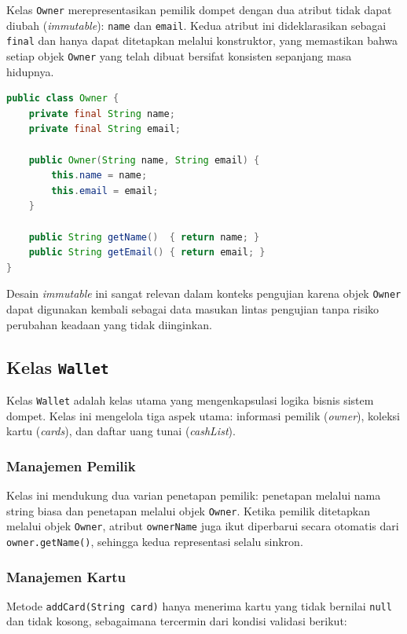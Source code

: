 \documentclass[12pt,a4paper]{article}
\begin{document}
Kelas \texttt{Owner} merepresentasikan pemilik dompet dengan dua atribut tidak dapat
diubah (\textit{immutable}): \texttt{name} dan \texttt{email}.  Kedua atribut ini
dideklarasikan sebagai \texttt{final} dan hanya dapat ditetapkan melalui konstruktor,
yang memastikan bahwa setiap objek \texttt{Owner} yang telah dibuat bersifat konsisten
sepanjang masa hidupnya.

\begin{lstlisting}[language=Java, caption={Definisi \texttt{Owner}}]
public class Owner {
    private final String name;
    private final String email;

    public Owner(String name, String email) {
        this.name = name;
        this.email = email;
    }

    public String getName()  { return name; }
    public String getEmail() { return email; }
}
\end{lstlisting}

Desain \textit{immutable} ini sangat relevan dalam konteks pengujian karena objek
\texttt{Owner} dapat digunakan kembali sebagai data masukan lintas pengujian tanpa
risiko perubahan keadaan yang tidak diinginkan.

\subsection{Kelas \texttt{Wallet}}

Kelas \texttt{Wallet} adalah kelas utama yang mengenkapsulasi logika bisnis sistem
dompet.  Kelas ini mengelola tiga aspek utama: informasi pemilik (\textit{owner}),
koleksi kartu (\textit{cards}), dan daftar uang tunai (\textit{cashList}).

\subsubsection{Manajemen Pemilik}

Kelas ini mendukung dua varian penetapan pemilik: penetapan melalui nama string biasa
dan penetapan melalui objek \texttt{Owner}.  Ketika pemilik ditetapkan melalui objek
\texttt{Owner}, atribut \texttt{ownerName} juga ikut diperbarui secara otomatis dari
\texttt{owner.getName()}, sehingga kedua representasi selalu sinkron.

\subsubsection{Manajemen Kartu}

Metode \texttt{addCard(String card)} hanya menerima kartu yang tidak bernilai
\texttt{null} dan tidak kosong, sebagaimana tercermin dari kondisi validasi berikut:
\end{document}
